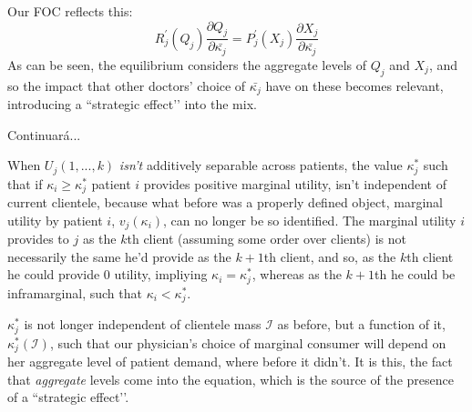 \documentclass{article}
\begin{document}
Our FOC reflects this:
\begin{equation*}
 R_j^{\prime}(Q_j)\frac{\partial Q_j}{\partial\bar{\kappa_j}} = P_j^{\prime}(X_j)\frac{\partial X_j}{\partial \bar{\kappa_j}} 
\end{equation*}
As can be seen, the equilibrium considers the aggregate levels of $Q_j$ and $X_j$, and so the impact that other doctors’ choice of $\bar{\kappa_j}$ have on these becomes relevant, introducing a ``strategic effect’’ into the mix.

Continuará...

When $U_j(1,...,k)$ \textit{isn’t} additively separable across patients, the value $\kappa_j^*$ such that if $\kappa_i \geq \kappa_j^*$ patient $i$ provides positive marginal utility, isn’t independent of current clientele, because what before was a properly defined object, marginal utility by patient $i$, $v_j(\kappa_i)$, can no longer be so identified. The marginal utility $i$ provides to $j$ as the $k$th client (assuming some order over clients) is not necessarily the same he’d provide as the $k+1$th client, and so, as the $k$th client he could provide $0$ utility, impliying $\kappa_i = \kappa_j^*$, whereas as the $k + 1$th he could be inframarginal, such that $\kappa_i < \kappa_j^*$.

$\kappa_j^*$ is not longer independent of clientele mass $\mathcal{I}$ as before, but a function of it, $\kappa_j^*(\mathcal{I})$, such that our physician’s choice of marginal consumer will depend on her aggregate level of patient demand, where before it didn’t. It is this, the fact that \textit{aggregate} levels come into the equation, which is the source of the presence of a ``strategic effect’’.
\end{document}
